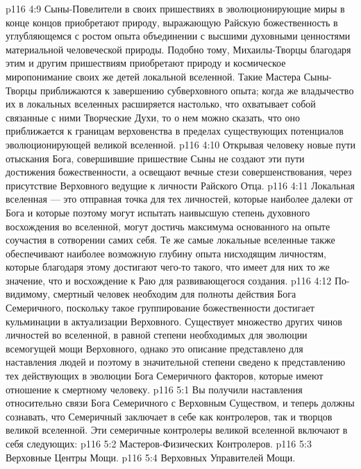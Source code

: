 \vs p116 4:9 Сыны\hyp{}Повелители в своих пришествиях в эволюционирующие миры в конце концов приобретают природу, выражающую Райскую божественность в углубляющемся с ростом опыта объединении с высшими духовными ценностями материальной человеческой природы. Подобно тому, Михаилы\hyp{}Творцы благодаря этим и другим пришествиям приобретают природу и космическое миропонимание своих же детей локальной вселенной. Такие Мастера Сыны\hyp{}Творцы приближаются к завершению субверховного опыта; когда же владычество их в локальных вселенных расширяется настолько, что охватывает собой связанные с ними Творческие Духи, то о нем можно сказать, что оно приближается к границам верховенства в пределах существующих потенциалов эволюционирующей великой вселенной.
\vs p116 4:10 Открывая человеку новые пути отыскания Бога, совершившие пришествие Сыны не создают эти пути достижения божественности, а освещают вечные стези совершенствования, через присутствие Верховного ведущие к личности Райского Отца.
\vs p116 4:11 Локальная вселенная --- это отправная точка для тех личностей, которые наиболее далеки от Бога и которые поэтому могут испытать наивысшую степень духовного восхождения во вселенной, могут достичь максимума основанного на опыте соучастия в сотворении самих себя. Те же самые локальные вселенные также обеспечивают наиболее возможную глубину опыта нисходящим личностям, которые благодаря этому достигают чего\hyp{}то такого, что имеет для них то же значение, что и восхождение к Раю для развивающегося создания.
\vs p116 4:12 \pc По\hyp{}видимому, смертный человек необходим для полноты действия Бога Семеричного, поскольку такое группирование божественности достигает кульминации в актуализации Верховного. Существует множество других чинов личностей во вселенной, в равной степени необходимых для эволюции всемогущей мощи Верховного, однако это описание представлено для наставления людей и поэтому в значительной степени сведено к представлению тех действующих в эволюции Бога Семеричного факторов, которые имеют отношение к смертному человеку.
\vs p116 5:1 Вы получили наставления относительно связи Бога Семеричного с Верховным Существом, и теперь должны сознавать, что Семеричный заключает в себе как контролеров, так и творцов великой вселенной. Эти семеричные контролеры великой вселенной включают в себя следующих:
\vs p116 5:2 \bibnobreakspace Мастеров\hyp{}Физических Контролеров.
\vs p116 5:3 \bibnobreakspace Верховные Центры Мощи.
\vs p116 5:4 \bibnobreakspace Верховных Управителей Мощи.

